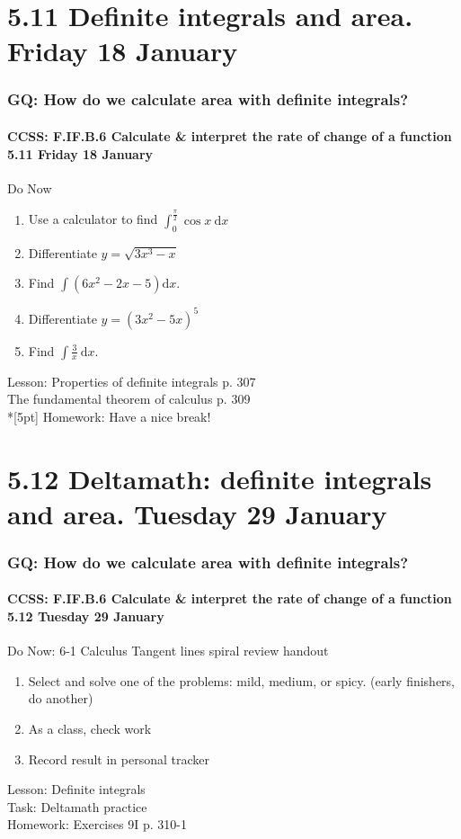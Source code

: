 \documentclass{beamer}
\begin{document}
  \section{5.11 Definite integrals and area. Friday 18 January}
  \frame
  {
    \frametitle{GQ: How do we calculate area with definite integrals?}
    \framesubtitle{CCSS: F.IF.B.6 Calculate \& interpret the rate of change of a function  \alert{5.11 Friday 18 January}}

    \begin{block}{Do Now}
    \begin{enumerate}
        \item Use a calculator to find $\displaystyle \int_0^{\frac{\pi}{2}}{\cos x}\ \mathrm{d}x$
        \item Differentiate $y=\sqrt{3x^3-x}$
        \item Find $\int{(6x^2-2x-5)}\mathrm{d}x$.
        \item Differentiate $y={(3x^2-5x)^5}$
        \item Find $\displaystyle \int \frac{3}{x}\ \mathrm{d}x$.
    \end{enumerate}
    \end{block}
    Lesson: Properties of definite integrals p. 307\\
    The fundamental theorem of calculus p. 309\\*[5pt]
    Homework: Have a nice break!
  }

  \section{5.12 Deltamath: definite integrals and area. Tuesday 29 January}
  \frame
  {
    \frametitle{GQ: How do we calculate area with definite integrals?}
    \framesubtitle{CCSS: F.IF.B.6 Calculate \& interpret the rate of change of a function  \alert{5.12 Tuesday 29 January}}

    \begin{block}{Do Now: 6-1 Calculus Tangent lines spiral review handout}
    \begin{enumerate}
        \item Select and solve one of the problems: mild, medium, or spicy. (early finishers, do another)
        \item As a class, check work
        \item Record result in personal tracker
    \end{enumerate}
    \end{block}
    Lesson: Definite integrals\\%
    Task: Deltamath practice\\%
    Homework: Exercises 9I p. 310-1
  }
\end{document}
